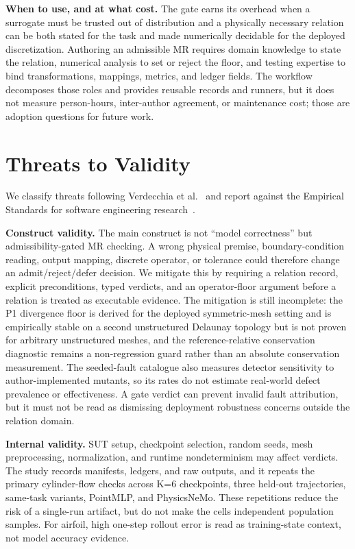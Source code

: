 \documentclass[preprint,12pt,authoryear]{elsarticle}
\begin{document}
\textbf{When to use, and at what cost.} The gate earns its overhead when a surrogate must be trusted out of distribution and a physically necessary relation can be both stated for the task and made numerically decidable for the deployed discretization. Authoring an admissible MR requires domain knowledge to state the relation, numerical analysis to set or reject the floor, and testing expertise to bind transformations, mappings, metrics, and ledger fields. The workflow decomposes those roles and provides reusable records and runners, but it does not measure person-hours, inter-author agreement, or maintenance cost; those are adoption questions for future work.

\section{Threats to Validity}
\label{sec:threats}

We classify threats following Verdecchia et al.~\citep{verdecchia2023threats} and report against the Empirical Standards for software engineering research~\citep{ralph2021empirical}.

\textbf{Construct validity.} The main construct is not ``model correctness'' but admissibility-gated MR checking. A wrong physical premise, boundary-condition reading, output mapping, discrete operator, or tolerance could therefore change an admit/reject/defer decision. We mitigate this by requiring a relation record, explicit preconditions, typed verdicts, and an operator-floor argument before a relation is treated as executable evidence. The mitigation is still incomplete: the P1 divergence floor is derived for the deployed symmetric-mesh setting and is empirically stable on a second unstructured Delaunay topology but is not proven for arbitrary unstructured meshes, and the reference-relative conservation diagnostic remains a non-regression guard rather than an absolute conservation measurement. The seeded-fault catalogue also measures detector sensitivity to author-implemented mutants, so its rates do not estimate real-world defect prevalence or effectiveness. A gate verdict can prevent invalid fault attribution, but it must not be read as dismissing deployment robustness concerns outside the relation domain.

\textbf{Internal validity.} SUT setup, checkpoint selection, random seeds, mesh preprocessing, normalization, and runtime nondeterminism may affect verdicts. The study records manifests, ledgers, and raw outputs, and it repeats the primary cylinder-flow checks across K=6 checkpoints, three held-out trajectories, same-task variants, PointMLP, and PhysicsNeMo. These repetitions reduce the risk of a single-run artifact, but do not make the cells independent population samples. For airfoil, high one-step rollout error is read as training-state context, not model accuracy evidence.
\end{document}
